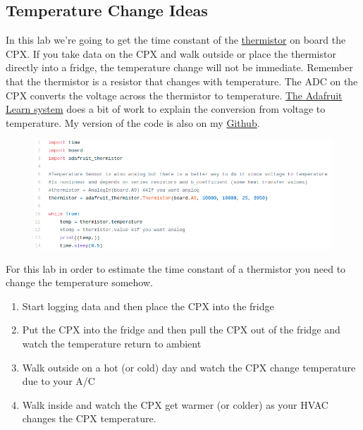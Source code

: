 \subsection{Temperature Change Ideas}

In this lab we’re going to get the time constant of the \href{https://en.wikipedia.org/wiki/Thermistor}{thermistor} on board the CPX. If you take data on the CPX and walk outside or place the thermistor directly into a fridge, the temperature change will not be immediate. Remember that the thermistor is a resistor that changes with temperature. The ADC on the CPX converts the voltage across the thermistor to temperature. \href{https://learn.adafruit.com/thermistor/circuitpython}{The Adafruit Learn system} does a bit of work to explain the conversion from voltage to temperature. My version of the code is also on my \href{https://github.com/cmontalvo251/Microcontrollers/blob/master/Circuit_Playground/CircuitPython/Temp/record_temperature_thermistor.py}{Github}.
\begin{figure}[H]
  \begin{center}
    \includegraphics[width=\textwidth]{Figures/thermistor.png}
  \end{center}
\end{figure}
For this lab in order to estimate the time constant of a thermistor you need to change the temperature somehow.
\begin{enumerate}[itemsep=-5pt]
\item Start logging data and then place the CPX into the fridge
\item Put the CPX into the fridge and then pull the CPX out of the fridge and watch the temperature return to ambient
\item Walk outside on a hot (or cold) day and watch the CPX change temperature due to your A/C
\item Walk inside and watch the CPX get warmer (or colder) as your HVAC changes the CPX temperature.
\end{enumerate}


